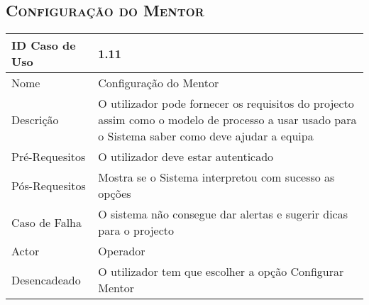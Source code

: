\documentclass[12pt]{article}
\begin{document}
\subsection{ \textsc{Configuração do Mentor}}

\begin{center}
\begin{tabular}{ | m{4cm} | m{10cm} | } 
\hline
ID Caso de Uso & 1.11\\
\hline
Nome & Configuração do Mentor\\
\hline
Descrição & O utilizador pode fornecer os requisitos do projecto assim como o modelo de processo a usar usado para o Sistema saber como deve ajudar a equipa\\
\hline
Pré-Requesitos & O utilizador deve estar autenticado\\
\hline
Pós-Requesitos & Mostra se o Sistema interpretou com sucesso as opções\\
\hline
Caso de Falha & O sistema não consegue dar alertas e sugerir dicas para o projecto\\
\hline
Actor & Operador\\
\hline
Desencadeado & O utilizador tem que escolher a opção Configurar Mentor\\
\hline
\end{tabular}
\end{center}

\pagebreak
\end{document}
